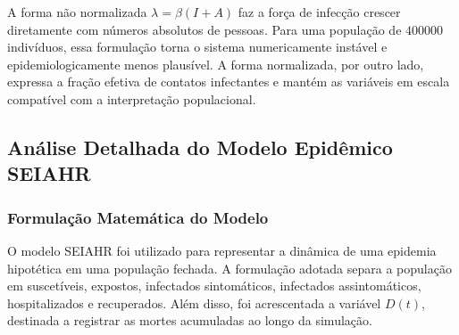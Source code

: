 \begin{table}[H]
    \centering
    \caption{Evolução selecionada do modelo SEIAHR normalizado pelo RK4.}
    \label{tab:seiahr-rk4-dias}
\end{table}

A forma não normalizada \(\lambda=\beta(I+A)\) faz a força de infecção crescer diretamente com números absolutos de pessoas. Para uma população de \(400000\) indivíduos, essa formulação torna o sistema numericamente instável e epidemiologicamente menos plausível. A forma normalizada, por outro lado, expressa a fração efetiva de contatos infectantes e mantém as variáveis em escala compatível com a interpretação populacional.

\subsection{Análise Detalhada do Modelo Epidêmico SEIAHR}

\subsubsection{Formulação Matemática do Modelo}

O modelo SEIAHR foi utilizado para representar a dinâmica de uma epidemia hipotética em uma população fechada. A formulação adotada separa a população em suscetíveis, expostos, infectados sintomáticos, infectados assintomáticos, hospitalizados e recuperados. Além disso, foi acrescentada a variável \(D(t)\), destinada a registrar as mortes acumuladas ao longo da simulação.

